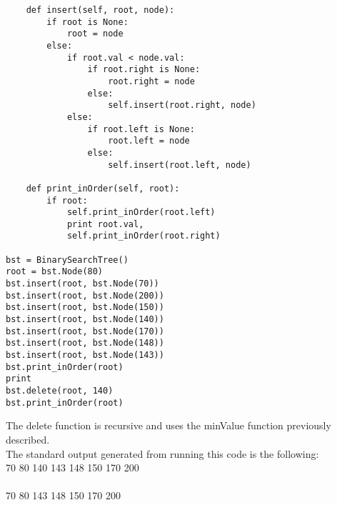 \documentclass[11pt]{article}
\begin{document}
\begin{enumerate}
\begin{enumerate}
\begin{verbatim}
    def insert(self, root, node):
        if root is None:
            root = node
        else:
            if root.val < node.val:
                if root.right is None:
                    root.right = node
                else:
                    self.insert(root.right, node)
            else:
                if root.left is None:
                    root.left = node
                else:
                    self.insert(root.left, node)
                    
    def print_inOrder(self, root):
        if root:
            self.print_inOrder(root.left)
            print root.val,
            self.print_inOrder(root.right)
            
bst = BinarySearchTree()
root = bst.Node(80)
bst.insert(root, bst.Node(70))
bst.insert(root, bst.Node(200))
bst.insert(root, bst.Node(150))
bst.insert(root, bst.Node(140))
bst.insert(root, bst.Node(170))
bst.insert(root, bst.Node(148))
bst.insert(root, bst.Node(143))
bst.print_inOrder(root)
print
bst.delete(root, 140)
bst.print_inOrder(root)
        \end{verbatim}
        The delete function is recursive and uses the minValue function previously described.
        \\ The standard output generated from running this code is the following:
        \\ 70 80 140 143 148 150 170 200
        \\\\ 70 80 143 148 150 170 200
    \end{enumerate}
    

\end{enumerate}
\end{document}
